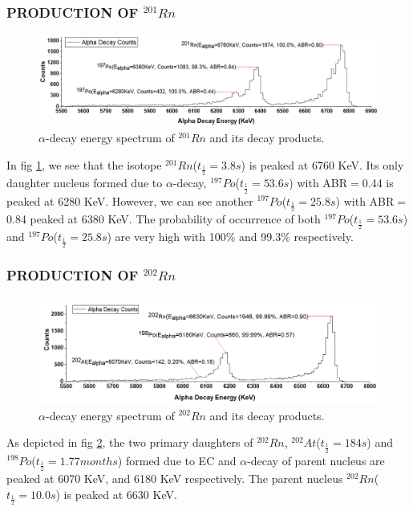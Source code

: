 \documentclass[12pt]{article}
\begin{document}
\subsubsection{PRODUCTION OF $^{201}Rn$}
\begin{figure}[h]
\centering
\includegraphics[scale=0.5]{Rn201.png}
\caption{$\alpha$-decay energy spectrum of $^{201}Rn$ and its decay products.}
\label{alpha-decay energy spectrum of 201Rn and its decay products.}
\end{figure}

In fig \ref{alpha-decay energy spectrum of 201Rn and its decay products.}, we see that the isotope $^{201}Rn$($t_\frac{1}{2}=3.8s$) is peaked at 6760 KeV. Its only daughter nucleus formed due to $\alpha$-decay, $^{197}Po$($t_\frac{1}{2}=53.6s$) with ABR$=$0.44 is peaked at 6280 KeV. However, we can see another $^{197}Po$($t_\frac{1}{2}=25.8s$) with ABR$=$0.84 peaked at 6380 KeV. The probability of occurrence of both $^{197}Po$($t_\frac{1}{2}=53.6s$) and $^{197}Po$($t_\frac{1}{2}=25.8s$) are very high with 100\% and 99.3\% respectively. 


\subsubsection{PRODUCTION OF $^{202}Rn$}
\begin{figure}[h]
\centering
\includegraphics[scale=0.5]{Rn202.png}
\caption{$\alpha$-decay energy spectrum of $^{202}Rn$ and its decay products.}
\label{alpha-decay energy spectrum of 202Rn and its decay products.}
\end{figure}

As depicted in fig \ref{alpha-decay energy spectrum of 202Rn and its decay products.}, the two primary daughters of $^{202}Rn$, $^{202}At$($t_\frac{1}{2}=184s$) and $^{198}Po$($t_\frac{1}{2}=1.77 months$) formed due to EC and $\alpha$-decay of parent nucleus are peaked at 6070 KeV, and 6180 KeV respectively. The parent nucleus $^{202}Rn$($t_\frac{1}{2}=10.0s$) is peaked at 6630 KeV.
\end{document}
